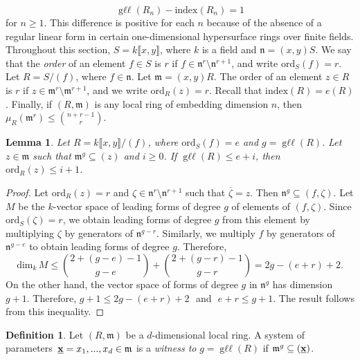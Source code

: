 \documentclass{amsart}
\newtheorem{lemma}[theorem]{Lemma}
\theoremstyle{definition}
\theoremstyle{definition}
\newtheorem{definition}[theorem]{Definition}
\DeclareMathOperator{\gll}{\text{g}\ell\ell}
\numberwithin{equation}{section}
\theoremstyle{definition}
\begin{document}
{\[\gll(R_{n})-\text{index}(R_{n})=1\]\text{}\newline for $n \geq 1$. This difference is positive for each $n$ because of the absence of a regular linear form in certain one-dimensional hypersurface rings over finite fields.
\newline\newline 
Throughout this section, $S=k\llbracket x,y \rrbracket$, where $k$ is a field and $\mathfrak{n}=(x,y)S$. We say that the \textit{order} of an element $f \in S$ is $r$ if $f \in \mathfrak{n}^{r} \setminus \mathfrak{n}^{r+1}$, and write $\text{ord}_{S}(f)=r$. Let $R=S/(f)$, where $f \in \mathfrak{n}$. Let $\mathfrak{m}=(x,y)R$. The order of an element $z \in R$ is $r$ if $z \in \mathfrak{m}^{r} \setminus \mathfrak{m}^{r+1}$, and we write $\text{ord}_{R}(z)=r$. Recall that $\text{index}(R)=e(R)$. Finally, if $(R,\mathfrak{m})$ is any local ring of embedding dimension $n$, then $\mu_{R}(\mathfrak{m}^{r}) \leq \binom{n+r-1}{r}$.\newline\newline 
\begin{lemma} Let $R=k \llbracket x,y \rrbracket/(f)$, where $\text{ord}_{S}(f)=e$ and $g=\gll(R)$. Let $z \in \mathfrak{m}$ such that $\mathfrak{m}^{g} \subseteq (z)$ and $i \geq 0$. If $\gll(R) \leq e+i$, then $\text{ord}_{R}(z) \leq i+1$.
\end{lemma} 
\begin{proof} Let $\text{ord}_{R}(z)=r$ and $\zeta \in \mathfrak{n}^{r} \setminus \mathfrak{n}^{r+1}$ such that $\overline{\zeta}=z$. Then $\mathfrak{n}^{g} \subseteq (f, \zeta)$. Let $M$ be the $k$-vector space of leading forms of degree $g$ of elements of $(f,\zeta)$. Since $\text{ord}_{S}(\zeta)=r$, we obtain leading forms of degree $g$ from this element by multiplying $\zeta$ by generators of $\mathfrak{n}^{g-r}$. Similarly, we multiply $f$ by generators of $\mathfrak{n}^{g-e}$ to obtain leading forms of degree $g$. Therefore,\newline 
\[\text{dim}_{k}\,M \leq \binom{2+(g-e)-1}{g-e}+\binom{2+(g-r)-1}{g-r}=2g-(e+r)+2. 
\]\text{} \newline
On the other hand, the vector space of forms of degree $g$ in $\mathfrak{n}^{g}$ has dimension $g+1$. Therefore, $g+1 \leq 2g-(e+r)+2$ \,\,and\,\, $e+r \leq g+1$. The result follows from this inequality. \end{proof}\text{}
\begin{definition}
Let $(R,\mathfrak{m})$ be a $d$-dimensional local ring. A system of parameters\, $\underline{\bf{x}}=x_1,...,x_d \in \mathfrak{m}$ is a {\it{witness to}} $g=\gll(R)$ if $\mathfrak{m}^g \subseteq (\underline{\bf{x}})$.

\end{definition}}
\end{document}
